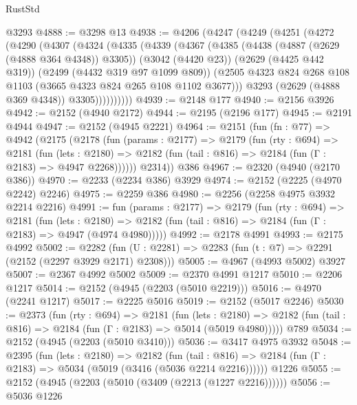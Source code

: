 \begin{lexlean}{RustStd}
\begin{coremodule}
    @3293
@4888 := @3298 @13
@4938 := @4206
    (@4247
      (@4249
        (@4251
          (@4272
            (@4290
              (@4307
                (@4324
                  (@4335
                    (@4339
                      (@4367
                        (@4385
                          (@4438 (@4887 (@2629 (@4888 @364 @4348)) @3305))
                          (@3042 (@4420 @23))
                          (@2629 (@4425 @442 @319))
                          (@2499 (@4432 @319 @97 @1099 @809))
                          (@2505
                            @4323
                            @824
                            @268
                            @108
                            @1103
                            (@3665 @4323 @824 @265 @108 @1102 @3677)))
                        @3293
                        (@2629 (@4888 @369 @4348))
                        @3305))))))))))
@4939 := @2148 @177
@4940 := @2156 @3926
@4942 := @2152 (@4940 @2172)
@4944 := @2195 (@2196 @177)
@4945 := @2191 @4944
@4947 := @2152 (@4945 @2221)
@4964 := @2151
    (fun (fn : @77) =>
    @4942
      (@2175
        (@2178
          (fun (params : @2177) =>
          @2179
            (fun (rty : @694) =>
            @2181
              (fun (lets : @2180) =>
              @2182 (fun (tail : @816) => @2184 (fun (Γ : @2183) => @4947 @2268))))))
        @2314))
    @386
@4967 := @2320 (@4940 (@2170 @386))
@4970 := @2233 (@2234 @386) @3929
@4974 := @2152 (@2225 (@4970 @2242) @2246)
@4975 := @2259 @386
@4980 := @2256 (@2258 @4975 @3932 @2214 @2216)
@4991 := fun (params : @2177) =>
  @2179
    (fun (rty : @694) =>
    @2181
      (fun (lets : @2180) =>
      @2182 (fun (tail : @816) => @2184 (fun (Γ : @2183) => @4947 (@4974 @4980)))))
@4992 := @2178 @4991
@4993 := @2175 @4992
@5002 := @2282 (fun (U : @2281) => @2283 (fun (t : @7) => @2291 (@2152 (@2297 @3929 @2171) @2308)))
@5005 := @4967 (@4993 @5002) @3927
@5007 := @2367 @4992 @5002
@5009 := @2370 @4991 @1217
@5010 := @2206 @1217
@5014 := @2152 (@4945 (@2203 (@5010 @2219)))
@5016 := @4970 (@2241 @1217)
@5017 := @2225 @5016
@5019 := @2152 (@5017 @2246)
@5030 := @2373
    (fun (rty : @694) =>
    @2181
      (fun (lets : @2180) =>
      @2182 (fun (tail : @816) => @2184 (fun (Γ : @2183) => @5014 (@5019 @4980)))))
    @789
@5034 := @2152 (@4945 (@2203 (@5010 @3410)))
@5036 := @3417 @4975 @3932
@5048 := @2395
    (fun (lets : @2180) =>
    @2182
      (fun (tail : @816) => @2184 (fun (Γ : @2183) => @5034 (@5019 (@3416 (@5036 @2214 @2216))))))
    @1226
@5055 := @2152 (@4945 (@2203 (@5010 (@3409 (@2213 (@1227 @2216))))))
@5056 := @5036 @1226

\end{coremodule}
\end{lexlean}

